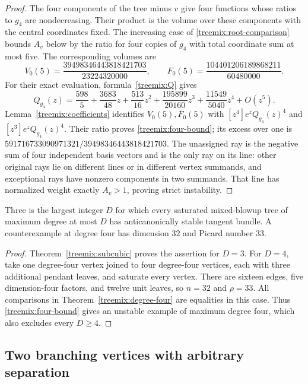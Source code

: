\begin{proof}
The four components of the tree minus $v$ give four functions whose
ratios to $g_4$ are nondecreasing. Their product is the volume over
these components with the central coordinates fixed. The increasing
case of \eqref{treemix:root-comparison} bounds $A_v$ below by the ratio
for four copies of $g_4$ with total coordinate sum at most five.
The corresponding volumes are
\[
 V_0(5)=\frac{39498346443818421703}{23224320000},\qquad
 F_0(5)=\frac{104401206189868211}{60480000}.
\]
For their exact evaluation, formula~\eqref{treemix:Q} gives
\[
 Q_{g_4}(z)=\frac{598}{5}+\frac{3683}{48}z+\frac{513}{16}z^2
       +\frac{195899}{20160}z^3+\frac{11549}{5040}z^4+O(z^5).
\]
Lemma~\ref{treemix:coefficients} identifies $V_0(5),F_0(5)$ with
$[z^4]e^zQ_{g_4}(z)^4$ and $[z^3]e^zQ_{g_4}(z)^4$.
Their ratio proves \eqref{treemix:four-bound}; its excess over one is
$591716733090971321/39498346443818421703$.
The unassigned ray is the negative sum of four independent basis
vectors and is the only ray on its line: other original rays lie on
different lines or in different vertex summands, and exceptional rays
have nonzero components in two summands. That line has normalized
weight exactly $A_v>1$, proving strict instability.
\end{proof}

\begin{corollary}\label{treemix:threshold}
Three is the largest integer $D$ for which every saturated mixed-blowup
tree of maximum degree at most $D$ has anticanonically stable tangent
bundle. A counterexample at degree four has dimension $32$ and Picard
number $33$.
\end{corollary}

\begin{proof}
Theorem~\ref{treemix:subcubic} proves the assertion for $D=3$.
For $D=4$, take one degree-four vertex joined to four degree-four
vertices, each with three additional pendant leaves, and saturate every
vertex. There are sixteen edges, five dimension-four factors, and twelve
unit leaves, so $n=32$ and $\rho=33$. All comparisons in
Theorem~\ref{treemix:degree-four} are equalities in this case. Thus
\eqref{treemix:four-bound} gives an unstable example of maximum degree
four, which also excludes every $D\ge4$.
\end{proof}

\subsection{Two branching vertices with arbitrary separation}

